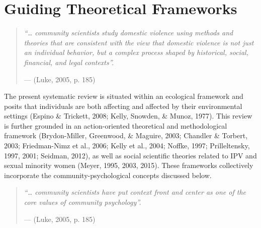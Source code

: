 \documentclass[11pt,]{tufte-book}
\begin{document}
\section{Guiding Theoretical
Frameworks}\label{guiding-theoretical-frameworks}

\singlespacing

\begin{quote}
\emph{``\ldots{} community scientists study domestic violence using
methods and theories that are consistent with the view that domestic
violence is not just an individual behavior, but a complex process
shaped by historical, social, financial, and legal contexts''.}

\hfill --- (Luke, 2005, p. 185)
\end{quote}

\doublespacing

The present systematic review is situated within an ecological framework
and posits that individuals are both affecting and affected by their
environmental settings (Espino \& Trickett, 2008; Kelly, Snowden, \&
Munoz, 1977). This review is further grounded in an action-oriented
theoretical and methodological framework (Brydon-Miller, Greenwood, \&
Maguire, 2003; Chandler \& Torbert, 2003; Friedman-Nimz et al., 2006;
Kelly et al., 2004; Noffke, 1997; Prilleltensky, 1997, 2001; Seidman,
2012), as well as social scientific theories related to IPV and sexual
minority women (Meyer, 1995, 2003, 2015). These frameworks collectively
incorporate the community-psychological concepts discussed below.


\singlespacing

\begin{quote}
\emph{``\ldots{} community scientists have put context front and center
as one of the core values of community psychology''.}

\hfill --- (Luke, 2005, p. 185)
\end{quote}

\doublespacing
\end{document}
